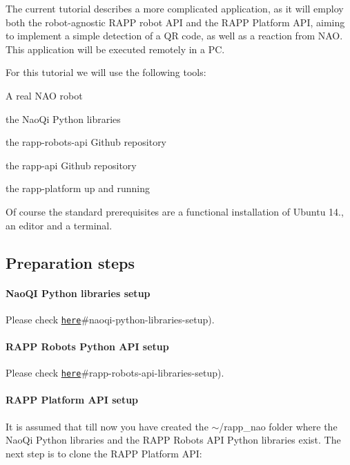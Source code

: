 The current tutorial describes a more complicated application, as it will employ both the robot-\/agnostic R\-A\-P\-P robot A\-P\-I and the R\-A\-P\-P Platform A\-P\-I, aiming to implement a simple detection of a Q\-R code, as well as a reaction from N\-A\-O. This application will be executed remotely in a P\-C.

For this tutorial we will use the following tools\-:


\begin{DoxyItemize}
\item A real N\-A\-O robot
\item the Nao\-Qi Python libraries
\item the rapp-\/robots-\/api Github repository
\item the rapp-\/api Github repository
\item the rapp-\/platform up and running
\end{DoxyItemize}

Of course the standard prerequisites are a functional installation of Ubuntu 14., an editor and a terminal.

\subsection*{Preparation steps}

\paragraph*{Nao\-Q\-I Python libraries setup}

Please check \href{https://github.com/rapp-project/rapp-platform/wiki/Create-a-remote-robotic-application-for-NAO-in-Python-(novice}{\tt here}\#naoqi-\/python-\/libraries-\/setup).

\paragraph*{R\-A\-P\-P Robots Python A\-P\-I setup}

Please check \href{https://github.com/rapp-project/rapp-platform/wiki/Create-a-remote-robotic-application-for-NAO-in-Python-(novice}{\tt here}\#rapp-\/robots-\/api-\/libraries-\/setup).

\paragraph*{R\-A\-P\-P Platform A\-P\-I setup}

It is assumed that till now you have created the {\ttfamily $\sim$/rapp\-\_\-nao} folder where the Nao\-Qi Python libraries and the R\-A\-P\-P Robots A\-P\-I Python libraries exist. The next step is to clone the R\-A\-P\-P Platform A\-P\-I\-:


